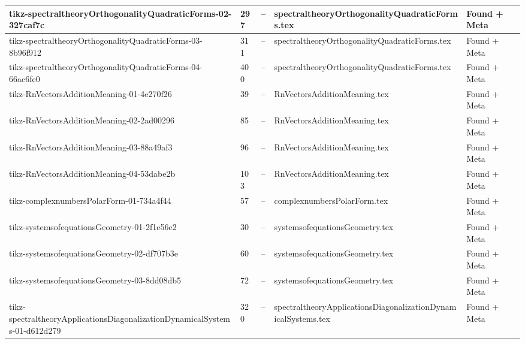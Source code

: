 \documentclass[11pt]{article}
\begin{document}
\begin{longtable}{|p{3.5cm}|p{1.5cm}|p{1cm}|p{4cm}|p{2cm}|}
tikz-spectraltheoryOrthogonalityQuadraticForms-02-327caf7c & 297 & -- & spectraltheoryOrthogonalityQuadraticForms.tex & \textcolor{found}{Found + Meta} \\
\hline

tikz-spectraltheoryOrthogonalityQuadraticForms-03-8b96f912 & 311 & -- & spectraltheoryOrthogonalityQuadraticForms.tex & \textcolor{found}{Found + Meta} \\
\hline

tikz-spectraltheoryOrthogonalityQuadraticForms-04-66ac6fe0 & 400 & -- & spectraltheoryOrthogonalityQuadraticForms.tex & \textcolor{found}{Found + Meta} \\
\hline

tikz-RnVectorsAdditionMeaning-01-4e270f26 & 39 & -- & RnVectorsAdditionMeaning.tex & \textcolor{found}{Found + Meta} \\
\hline

tikz-RnVectorsAdditionMeaning-02-2ad00296 & 85 & -- & RnVectorsAdditionMeaning.tex & \textcolor{found}{Found + Meta} \\
\hline

tikz-RnVectorsAdditionMeaning-03-88a49af3 & 96 & -- & RnVectorsAdditionMeaning.tex & \textcolor{found}{Found + Meta} \\
\hline

tikz-RnVectorsAdditionMeaning-04-53dabe2b & 103 & -- & RnVectorsAdditionMeaning.tex & \textcolor{found}{Found + Meta} \\
\hline

tikz-complexnumbersPolarForm-01-734a4f44 & 57 & -- & complexnumbersPolarForm.tex & \textcolor{found}{Found + Meta} \\
\hline

tikz-systemsofequationsGeometry-01-2f1e56e2 & 30 & -- & systemsofequationsGeometry.tex & \textcolor{found}{Found + Meta} \\
\hline

tikz-systemsofequationsGeometry-02-df707b3e & 60 & -- & systemsofequationsGeometry.tex & \textcolor{found}{Found + Meta} \\
\hline

tikz-systemsofequationsGeometry-03-8dd08db5 & 72 & -- & systemsofequationsGeometry.tex & \textcolor{found}{Found + Meta} \\
\hline

tikz-spectraltheoryApplicationsDiagonalizationDynamicalSystems-01-d612d279 & 320 & -- & spectraltheoryApplicationsDiagonalizationDynamicalSystems.tex & \textcolor{found}{Found + Meta} \\
\hline


\end{longtable}
\end{document}

